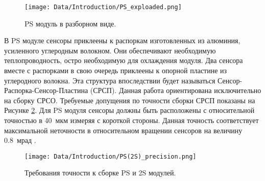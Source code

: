 \begin{figure}[ht]\centering
\texttt{[image: Data/Introduction/PS\_exploaded.png]}
\caption{PS модуль в разборном виде.}
\label{fig:ps_exploaded}
\end{figure}

В PS модуле сенсоры приклеены к распоркам изготовленных из алюминия, усиленного углеродным волокном. Они обеспечивают необходимую теплопроводность, остро необходимую для охлаждения модуля. Два сенсора вместе с распорками в свою очередь приклеены к опорной пластине из углеродного волокна. Эта структура впоследствии будет называться Сенсор-Распорка-Сенсор-Пластина (СРСП). Данная работа ориентирована исключительно на сборку 
СРСО. Требуемые допущения по точности сборки СРСП показаны на Рисунке \ref{fig:ps(2s)_precision}. Для PS модуля сенсоры должны быть расположены с относительной точностью в 40~мкм измеряя с короткой стороны. Данная точность соответствует максимальной неточности в относительном вращении сенсоров на величину 0.8~мрад \cite{AutomatedAssembly_tutorial}.

\begin{figure}[ht]\centering
\texttt{[image: Data/Introduction/PS(2S)\_precision.png]}
\caption{Требования точности к сборке PS и 2S модулей.}
\label{fig:ps(2s)_precision}
\end{figure}
